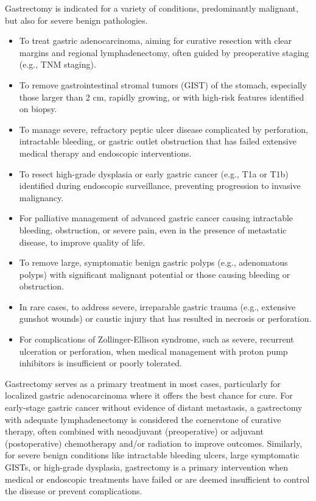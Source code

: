 Gastrectomy is indicated for a variety of conditions, predominantly malignant, but also for severe benign pathologies.

\begin{itemize}
  \item To treat gastric adenocarcinoma, aiming for curative resection with clear margins and regional lymphadenectomy, often guided by preoperative staging (e.g., TNM staging).
  \item To remove gastrointestinal stromal tumors (GIST) of the stomach, especially those larger than 2 cm, rapidly growing, or with high-risk features identified on biopsy.
  \item To manage severe, refractory peptic ulcer disease complicated by perforation, intractable bleeding, or gastric outlet obstruction that has failed extensive medical therapy and endoscopic interventions.
  \item To resect high-grade dysplasia or early gastric cancer (e.g., T1a or T1b) identified during endoscopic surveillance, preventing progression to invasive malignancy.
  \item For palliative management of advanced gastric cancer causing intractable bleeding, obstruction, or severe pain, even in the presence of metastatic disease, to improve quality of life.
  \item To remove large, symptomatic benign gastric polyps (e.g., adenomatous polyps) with significant malignant potential or those causing bleeding or obstruction.
  \item In rare cases, to address severe, irreparable gastric trauma (e.g., extensive gunshot wounds) or caustic injury that has resulted in necrosis or perforation.
  \item For complications of Zollinger-Ellison syndrome, such as severe, recurrent ulceration or perforation, when medical management with proton pump inhibitors is insufficient or poorly tolerated.
\end{itemize}

Gastrectomy serves as a primary treatment in most cases, particularly for localized gastric adenocarcinoma where it offers the best chance for cure. For early-stage gastric cancer without evidence of distant metastasis, a gastrectomy with adequate lymphadenectomy is considered the cornerstone of curative therapy, often combined with neoadjuvant (preoperative) or adjuvant (postoperative) chemotherapy and/or radiation to improve outcomes. Similarly, for severe benign conditions like intractable bleeding ulcers, large symptomatic GISTs, or high-grade dysplasia, gastrectomy is a primary intervention when medical or endoscopic treatments have failed or are deemed insufficient to control the disease or prevent complications.

